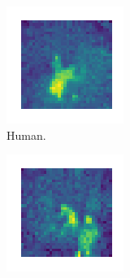 \documentclass[10pt,letterpaper,conference]{IEEEtran}
\begin{document}
\begin{figure}[!ht]
  \centering
  \begin{subfigure}{0.2\textwidth}
      \includegraphics[width=\textwidth]{human.png}
      \caption{Human.}
      \label{fig:first}
  \end{subfigure}
  \begin{subfigure}{0.2\textwidth}
      \includegraphics[width=\textwidth]{two-humans.png}

\end{subfigure}
\end{figure}
\end{document}
